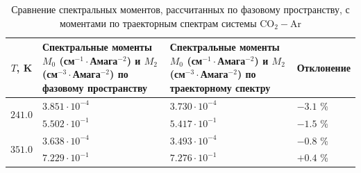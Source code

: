 \begin{table}[H]
    \begin{tabular}{c >{\centering}p{6cm} >{\centering}p{6cm} >{\centering}p{3cm}}
        \toprule
        $T$, K & Спектральные моменты $M_0$ (см$^{-1} \cdot$Амага$^{-2}$) и $M_2$ (см$^{-3} \cdot$Амага$^{-2}$) по фазовому пространству & Спектральные моменты $M_0$ (см$^{-1} \cdot$Амага$^{-2}$) и $M_2$ (см$^{-3} \cdot$Амага$^{-2}$) по траекторному спектру & Отклонение \tabularnewline
        \midrule
        \multirow{2}{*}{$241.0$} & $3.851 \cdot 10^{-4}$ & $3.730 \cdot 10^{-4}$ & $-3.1$ \%  \tabularnewline
                                 & $5.502 \cdot 10^{-1}$ & $5.417 \cdot 10^{-1}$ & $-1.5$ \%  \tabularnewline
        \midrule
        \multirow{2}{*}{$351.0$} & $3.638 \cdot 10^{-4}$ & $3.493 \cdot 10^{-4}$ & $-0.8$ \%  \tabularnewline
                                 & $7.229 \cdot 10^{-1}$ & $7.276 \cdot 10^{-1}$ & $+0.4$ \%  \tabularnewline
        \bottomrule
    \end{tabular}
    \caption{Сравнение спектральных моментов, рассчитанных по фазовому пространству, с моментами по траекторным спектрам системы CO$_2-$Ar}
    \label{table:co2ar-moments}
\end{table}


